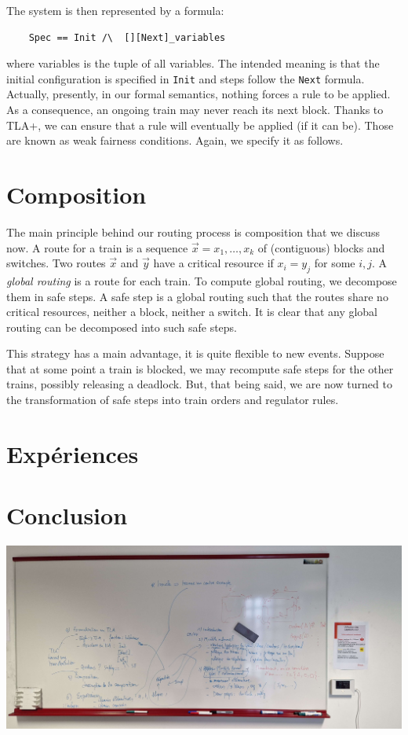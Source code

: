 \documentclass[runningheads]{llncs}
\begin{document}
The system is then represented by a formula:
\begin{verbatim}
    Spec == Init /\  [][Next]_variables
\end{verbatim}%
where variables is the tuple of all variables. The intended meaning is that the initial configuration is specified in \texttt{Init} and steps follow the \texttt{Next} formula.  Actually, presently, in our formal semantics, nothing forces a rule to be applied. As a consequence, an ongoing train may never reach its next block. Thanks to TLA+, we can ensure that a rule will eventually be applied (if it can be). Those are known as weak fairness conditions. Again, we specify it as follows. 

\section{Composition}
\label{sec:composition}

The main principle behind our routing process is composition that we discuss now. A route for a train is a sequence $\vec{x} = x_1, \ldots, x_k$ of (contiguous) blocks and switches. Two routes $\vec{x}$ and $\vec{y}$ have a critical resource if  $x_i = y_j$ for some $i,j$. A \emph{global routing} is a route for each train. To compute global routing, we decompose them in  safe steps. A safe step is a global routing such that the routes share no critical resources, neither a block, neither a switch. It is clear that any global routing can be decomposed into such safe steps.

This strategy has a main advantage, it is quite flexible to new events. Suppose that at some point a train is blocked, we may recompute safe steps for the other trains, possibly releasing a deadlock. But, that being said, we are now turned to the transformation of safe steps into train orders and regulator rules. 


\section{Expériences}
\label{sec:experiments}


\section{Conclusion}
\label{sec:conclusion}

\includegraphics[scale=0.1]{img/sommaire_tableau.jpg}
\end{document}
